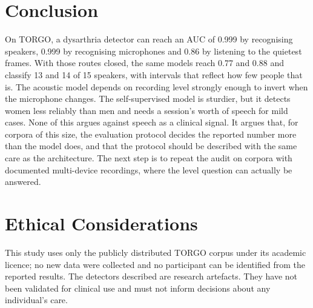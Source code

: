 \documentclass[conference]{IEEEtran}
\begin{document}
\section{Conclusion}
On TORGO, a dysarthria detector can reach an AUC of 0.999 by recognising speakers, 0.999 by recognising microphones and 0.86 by listening to the quietest frames. With those routes closed, the same models reach 0.77 and 0.88 and classify 13 and 14 of 15 speakers, with intervals that reflect how few people that is. The acoustic model depends on recording level strongly enough to invert when the microphone changes. The self-supervised model is sturdier, but it detects women less reliably than men and needs a session's worth of speech for mild cases. None of this argues against speech as a clinical signal. It argues that, for corpora of this size, the evaluation protocol decides the reported number more than the model does, and that the protocol should be described with the same care as the architecture. The next step is to repeat the audit on corpora with documented multi-device recordings, where the level question can actually be answered.

\section*{Ethical Considerations}
This study uses only the publicly distributed TORGO corpus under its academic licence; no new data were collected and no participant can be identified from the reported results. The detectors described are research artefacts. They have not been validated for clinical use and must not inform decisions about any individual's care.
\end{document}
